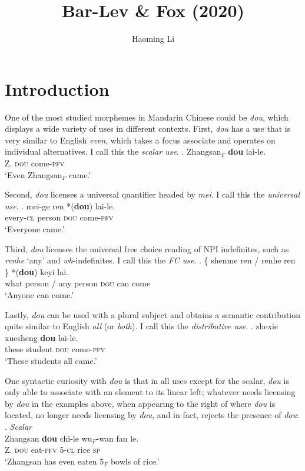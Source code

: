 \documentclass[12pt]{article}
\title{Bar-Lev \& Fox (2020)}
\author{Haoming Li}
\begin{document}
%
\section{Introduction}
\label{sec:introduction}


One of the most studied morphemes in Mandarin Chinese could be \emph{dou}, which displays a wide variety of uses in different contexts.
First, \emph{dou} has a use that is very similar to English \emph{even}, which takes a focus associate and operates on individual alternatives.
I call this the \emph{scalar use}.
\ex. \gll
Zhangsan\(_F\) \textbf{dou} lai-le. \\
Z. \textsc{dou} come-\textsc{pfv} \\
\glt `Even Zhangsan\(_F\) came.'

Second, \emph{dou} licenses a universal quantifier headed by \emph{mei}.
I call this the \emph{universal use}.
\ex. \gll
mei-ge ren *(\textbf{dou}) lai-le. \\
every-\textsc{cl} person \phantom{*(}\textsc{dou} come-\textsc{pfv} \\
\glt `Everyone came.'

Third, \emph{dou} licenses the universal free choice reading of NPI indefinites, such as \emph{renhe} `any' and \emph{wh}-indefinites.
I call this the \emph{FC use}.
\ex. \gll
\{ shenme ren / renhe ren \} *(\textbf{dou}) keyi lai. \\
{}  what person / any person {} \phantom{*(}\textsc{dou} can come \\
\glt `Anyone can come.'

Lastly, \emph{dou} can be used with a  plural subject and obtains a semantic contribution quite similar to English \emph{all} (or \emph{both}).
I call this the \emph{distributive use}.
\ex. \gll
zhexie xuesheng \textbf{dou} lai-le. \\
these student \textsc{dou} come-\textsc{pfv} \\
\glt `These students all came.'

One syntactic curiosity with \emph{dou} is that in all uses except for the scalar, \emph{dou} is only able to associate with an element to its linear left; whatever needs licensing by \emph{dou} in the examples above, when appearing to the right of where \emph{dou} is located, no longer needs licensing by \emph{dou}, and in fact, rejects the presence of \emph{dou}:
\ex. \emph{Scalar}\\
\gll
Zhangsan \textbf{dou} chi-le wu\(_F\)-wan fan le. \\
Z. \textsc{dou} eat-\textsc{pfv} 5-\textsc{cl} rice \textsc{sp} \\
\glt `Zhangsan has even eaten 5\(_F\) bowls of rice.'
\end{document}
